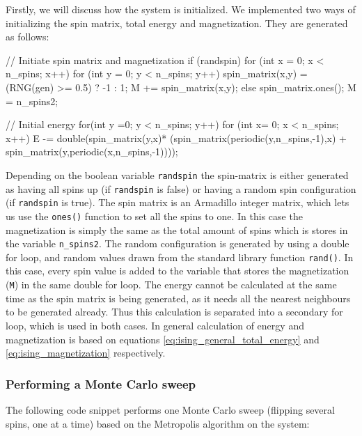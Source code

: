 \documentclass[reprint,english,notitlepage]{revtex4-1}  %
\begin{document}
Firstly, we will discuss how the system is initialized. We implemented two ways of initializing the spin matrix, total energy and magnetization. They are generated as follows:

\begin{cpp}
// Initiate spin matrix and magnetization
if (randspin) {
  for (int x = 0; x < n_spins; x++) {
    for (int y = 0; y < n_spins; y++) {
      spin_matrix(x,y) = (RNG(gen) >= 0.5) ? -1 : 1;
      M += spin_matrix(x,y);
    }
  }
} else {
  spin_matrix.ones();
  M = n_spins2;
}


// Initial energy
for(int y =0; y < n_spins; y++) {
  for (int x= 0; x < n_spins; x++){
    E -=  double(spin_matrix(y,x)*
          (spin_matrix(periodic(y,n_spins,-1),x) +
          spin_matrix(y,periodic(x,n_spins,-1))));
  }
}
\end{cpp}

Depending on the boolean variable \verb+randspin+ the spin-matrix is either generated as having all spins up (if \verb+randspin+ is false) or having a random spin configuration (if \verb+randspin+ is true). The spin matrix is an Armadillo \citep{Armadillo} integer matrix, which lets us use the \verb+ones()+ function to set all the spins to one. In this case the magnetization is simply the same as the total amount of spins which is stores in the variable \verb+n_spins2+. The random configuration is generated by using a double for loop, and random values drawn from the standard library function \verb+rand()+. In this case, every spin value is added to the variable that stores the magnetization (\verb+M+) in the same double for loop. The energy cannot be calculated at the same time as the spin matrix is being generated, as it needs all the nearest neighbours to be generated already. Thus this calculation is separated into a secondary for loop, which is used in both cases. In general calculation of energy and magnetization is based on equations  \eqref{eq:ising_general_total_energy} and \eqref{eq:ising_magnetization} respectively.


\subsubsection{Performing a Monte Carlo sweep} \label{sec:III:a:ii}

The following code snippet performs one Monte Carlo sweep (flipping several spins, one at a time) based on the Metropolis algorithm on the system:
\end{document}
